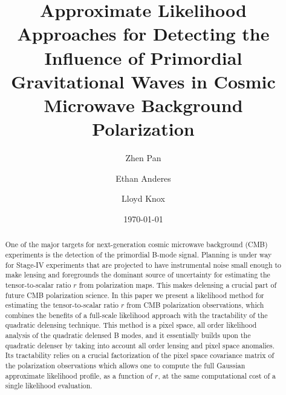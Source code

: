 \documentclass[aps, prd, reprint, nofootinbib, groupedaddress, showpacs]{revtex4-1}
\begin{document}
\title{Approximate Likelihood Approaches for Detecting the Influence of Primordial
Gravitational Waves in Cosmic Microwave Background Polarization}
\author{Zhen Pan}
\author{Ethan Anderes}
\author{Lloyd Knox}

\date{\today}

\begin{abstract}
One of the major targets for next-generation cosmic microwave background (CMB)
experiments is the detection of the primordial B-mode signal. Planning is under
way for Stage-IV experiments that are projected to have instrumental noise small
enough to make lensing and foregrounds the dominant source of uncertainty for estimating
the tensor-to-scalar ratio $r$ from polarization maps.
This makes delensing a crucial part of future CMB polarization science.
In this paper we  present a likelihood method for estimating the
tensor-to-scalar ratio $r$ from CMB polarization observations, which
combines the benefits of a full-scale likelihood approach with the tractability
of the quadratic delensing technique.
This method is a pixel space, all order likelihood analysis of the quadratic delensed B modes,
and it essentially builds upon the quadratic
delenser by taking into account all order lensing and pixel space anomalies.
Its tractability relies on a crucial factorization of the pixel space covariance matrix of the
polarization observations which allows one to compute the full Gaussian approximate likelihood profile,
as a function of $r$, at the same computational cost of a single likelihood evaluation.
\end{abstract}


\maketitle
\end{document}
